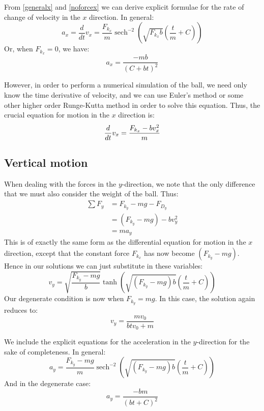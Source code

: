 \documentclass[12pt, twoside, a4paper]{article}
\DeclareMathOperator{\sech}{sech}
\begin{document}
From \eqref{generalx} and \eqref{noforcex} we can derive explicit formulae for the rate of change of velocity in the $x$ direction. In general: 
\begin{equation} \label{explicitx}
a_x = \frac{d}{dt} v_x = \frac{F_{k_x}}{m} \sech ^{-2} \left( \sqrt{F_{k_x} b} \left( \frac{t}{m} + C \right) \right)
\end{equation}
Or, when $F_{k_x} = 0$, we have:
\begin{equation} \label{explicitxnoforce}
a_x = \frac{-mb}{\left( C + bt \right) ^2}
\end{equation}

However, in order to perform a numerical simulation of the ball, we need only know the time derivative of velocity, and we can use Euler's method or some other higher order Runge-Kutta method in order to solve this equation. Thus, the crucial equation for motion in the $x$ direction is:
\begin{equation} \label{dex}
\frac{d}{dt} v_x =  \frac{F_{k_x} - bv_x^2}{m} \\
\end{equation}

\subsection{Vertical motion}
When dealing with the forces in the $y$-direction, we note that the only difference that we must also consider the weight of the ball. Thus:
\begin{align*}
\sum F_y &= F_{k_y} - mg - F_{D_y} \\
&= (F_{k_y} - mg) - bv_y^2 \\
&= ma_y
\end{align*}
This is of exactly the same form as the differential equation for motion in the $x$ direction, except that the constant force $F_{k_x}$ has now become $(F_{k_y} - mg)$. Hence in our solutions we can just substitute in these variables:
\begin{equation} \label{generaly}
v_y = \sqrt{\frac{F_{k_y} - mg}{b}} \tanh \left( \sqrt{(F_{k_y} - mg) b } \left(\frac{t}{m} + C \right) \right)
\end{equation}
Our degenerate condition is now when $F_{k_y} = mg$. In this case, the solution again reduces to:
\begin{equation}  \label{noforcey}
v_y = \frac{m v_0}{btv_0 + m}
\end{equation}

We include the explicit equations for the acceleration in the $y$-direction for the sake of completeness. In general:
\begin{equation}  \label{explicity}
a_y = \frac{F_{k_y} - mg}{m} \sech ^{-2} \left( \sqrt{(F_{k_y} - mg) b} \left( \frac{t}{m} + C \right) \right)
\end{equation}
And in the degenerate case:
\begin{equation} \label{explicitynoforce}
a_y = \frac{-bm}{\left( bt + C \right) ^2}
\end{equation}
\end{document}
